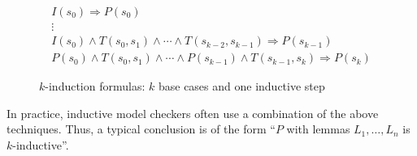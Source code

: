 \begin{figure}
\begin{gather*}
I(s_0) \Rightarrow P(s_0) \\[-2pt]
%
\vdots \\[2pt]
%
I(s_0) \land T(s_0, s_1) \land \cdots \land T(s_{k-2}, s_{k-1})
\Rightarrow P(s_{k-1}) \\[2pt]
%
P(s_0) \land T(s_0, s_1) \land \cdots \land P(s_{k-1}) \land
T(s_{k-1}, s_k) \Rightarrow P(s_k)
\end{gather*}
\caption{$k$-induction formulas: $k$ base cases and one inductive
  step}
\label{fig:k-induction}
\end{figure}

In practice, inductive model checkers often use a combination of the
above techniques. Thus, a typical conclusion is of the form ``$P$ with
lemmas $L_1, \ldots, L_n$ is $k$-inductive''.


